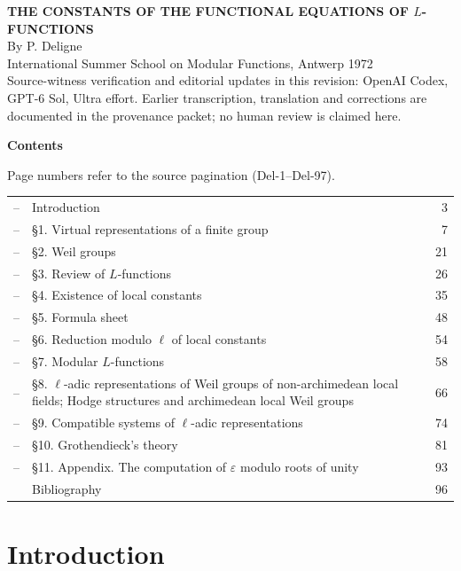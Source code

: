 \documentclass[10pt,letterpaper]{article}
\begin{document}
\begin{center}
{\Large\bfseries THE CONSTANTS OF THE FUNCTIONAL EQUATIONS OF \(L\)-FUNCTIONS}\\[2em]
{\large By P. Deligne}\\[6em]
International Summer School on Modular Functions, Antwerp 1972\\[2em]
{\small Source-witness verification and editorial updates in this revision:
OpenAI Codex, GPT-6 Sol, Ultra effort. Earlier transcription, translation and
corrections are documented in the provenance packet; no human review is claimed here.}
\end{center}

\newpage

\begin{center}
\bfseries Contents
\end{center}

\noindent Page numbers refer to the source pagination (Del-1--Del-97).
\medskip

\noindent\begin{tabularx}{\textwidth}{@{}p{}Xr@{}}
--& Introduction & 3\\
--& \S1. Virtual representations of a finite group & 7\\
--& \S2. Weil groups & 21\\
--& \S3. Review of \(L\)-functions & 26\\
--& \S4. Existence of local constants & 35\\
--& \S5. Formula sheet & 48\\
--& \S6. Reduction modulo \(\ell\) of local constants & 54\\
--& \S7. Modular \(L\)-functions & 58\\
--& \S8. \(\ell\)-adic representations of Weil groups of non-archimedean local fields; Hodge structures and archimedean local Weil groups & 66\\
--& \S9. Compatible systems of \(\ell\)-adic representations & 74\\
--& \S10. Grothendieck's theory & 81\\
--& \S11. Appendix. The computation of \(\varepsilon\) modulo roots of unity & 93\\
& Bibliography & 96
\end{tabularx}

\newpage

\section*{Introduction}
\end{document}
